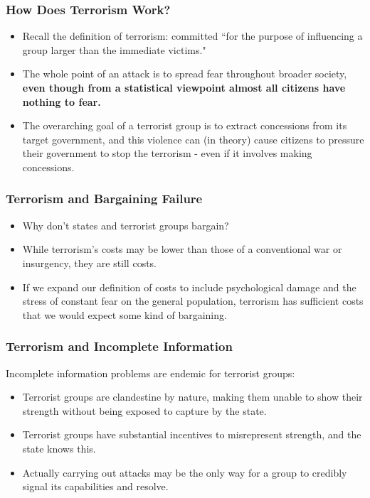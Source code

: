 \documentclass{beamer}
\begin{document}
\begin{frame} 
	\frametitle{\LARGE{How Does Terrorism Work?}}
	\begin{itemize}
		\item Recall the definition of terrorism: committed ``for the purpose of influencing a group larger than the immediate victims." \pause
		\item The whole point of an attack is to spread fear throughout broader society, \textbf{even though from a statistical viewpoint almost all citizens have nothing to fear.}
		\item The overarching goal of a terrorist group is to extract concessions from its target government, and this violence can (in theory) cause citizens to pressure their government to stop the terrorism - even if it involves making concessions.
	\end{itemize}
\end{frame}

\begin{frame} 
\frametitle{\LARGE{Terrorism and Bargaining Failure}}
\begin{itemize}
		\item Why don't states and terrorist groups bargain? \pause
		\item While terrorism's costs may be lower than those of a conventional war or insurgency, they are still costs. \pause
		\item If we expand our definition of costs to include psychological damage and the stress of constant fear on the general population, terrorism has sufficient costs that we would expect some kind of bargaining. 
\end{itemize}
\end{frame}

\begin{frame} 
\frametitle{\LARGE{Terrorism and Incomplete Information}}
Incomplete information problems are endemic for terrorist groups:
\begin{itemize}
		\item Terrorist groups are clandestine by nature, making them unable to show their strength without being exposed to capture by the state. \pause
		\item Terrorist groups have substantial incentives to misrepresent strength, and the state knows this. \pause
		\item Actually carrying out attacks may be the only way for a group to credibly signal its capabilities and resolve.
\end{itemize}
\end{frame}
\end{document}
